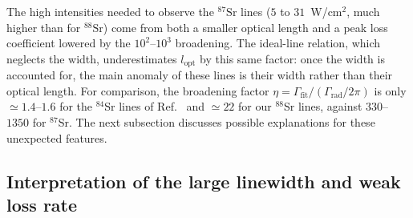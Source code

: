 The high intensities needed to observe the $^{87}\text{Sr}$ lines ($5$ to $31$~W/cm$^2$, much higher than for $^{88}\text{Sr}$) come from both a smaller optical length and a peak loss coefficient lowered by the $10^2$--$10^3$ broadening. The ideal-line relation, which neglects the width, underestimates $l_{\text{opt}}$ by this same factor: once the width is accounted for, the main anomaly of these lines is their width rather than their optical length. For comparison, the broadening factor $\eta=\Gamma_{\text{fit}}/(\Gamma_{\text{rad}}/2\pi)$ is only $\simeq1.4$--$1.6$ for the $^{84}$Sr lines of Ref.~\cite{reschovsky_narrow-line_2018} and $\simeq22$ for our $^{88}$Sr lines, against $330$--$1350$ for $^{87}$Sr.
The next subsection discusses possible explanations for these unexpected features.

\subsection{Interpretation of the large linewidth and weak loss rate}
